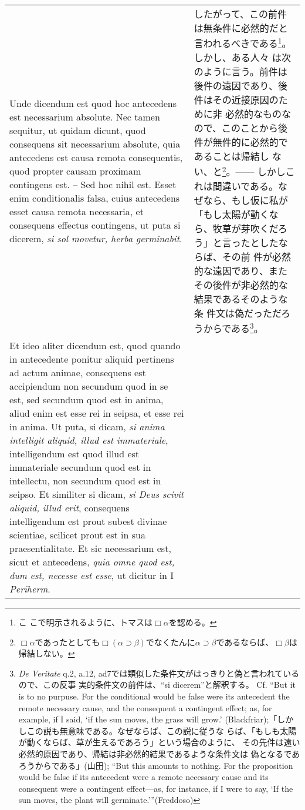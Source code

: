 \documentclass[10pt]{jsarticle} %
\begin{document}
\begin{longtable}{p{21em}p{21em}}
\\


Unde dicendum est quod hoc antecedens est necessarium absolute. Nec
tamen sequitur, ut quidam dicunt, quod consequens sit necessarium
absolute, quia antecedens est causa remota consequentis, quod propter
causam proximam contingens est. -- Sed hoc nihil est. Esset enim
conditionalis falsa, cuius antecedens esset causa remota necessaria,
et consequens effectus contingens, ut puta si dicerem, {\itshape si
sol movetur, herba germinabit}.

&

したがって、この前件は無条件に必然的だと言われるべきである\footnote{こ
こで明示されるように、トマスは$\Box \alpha$を認める。}。しかし、ある人々
は次のように言う。前件は後件の遠因であり、後件はその近接原因のために非
必然的なものなので、このことから後件が無件的に必然的であることは帰結し
ない、と\footnote{$\Box \alpha$であったとしても$\Box(\alpha \supset
\beta)$でなくたんに$\alpha \supset \beta$であるならば、$\Box \beta$は
帰結しない。}。------ しかしこれは間違いである。なぜなら、もし仮に私が
「もし太陽が動くなら、牧草が芽吹くだろう」と言ったとしたならば、その前
件が必然的な遠因であり、またその後件が非必然的な結果であるそのような条
件文は偽だっただろうからである\footnote{{\itshape De Veritate} q.2,
a.12, ad7では類似した条件文がはっきりと偽と言われているので、この反事
実的条件文の前件は、``si dicerem''と解釈する。 Cf. ``But it is to no
purpuse. For the conditional would be false were its antecedent the
remote necessary cause, and the consequent a contingent effect; as,
for example, if I said, `if the sun moves, the grass will grow.'
(Blackfriar);「しかしこの説も無意味である。なぜならば、この説に従うな
らば、「もしも太陽が動くならば、草が生えるであろう」という場合のように、
その先件は遠い必然的原因であり、帰結は非必然的結果であるような条件文は
偽となるであろうからである」(山田); ``But this amounts to nothing. For
the proposition would be false if its antecedent were a remote
necessary cause and its consequent were a contingent effect—as, for
instance, if I were to say, ‘If the sun moves, the plant will
germinate.’''(Freddoso)}。

\\


Et ideo aliter dicendum est, quod quando in antecedente ponitur
aliquid pertinens ad actum animae, consequens est accipiendum non
secundum quod in se est, sed secundum quod est in anima, aliud enim
est esse rei in seipsa, et esse rei in anima. Ut puta, si dicam,
{\itshape si anima intelligit aliquid, illud est immateriale},
intelligendum est quod illud est immateriale secundum quod est in
intellectu, non secundum quod est in seipso. Et similiter si dicam,
{\itshape si Deus scivit aliquid, illud erit}, consequens
intelligendum est prout subest divinae scientiae, scilicet prout est
in sua praesentialitate. Et sic necessarium est, sicut et antecedens,
{\itshape quia omne quod est, dum est, necesse est esse}, ut dicitur
in I {\itshape Periherm}.



\end{longtable}
\end{document}
